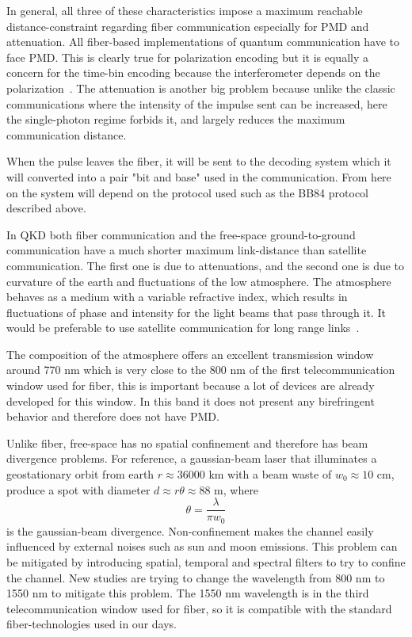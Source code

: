 In general, all three of these characteristics impose a maximum reachable distance-constraint regarding fiber communication especially for PMD and attenuation. All fiber-based implementations of quantum communication have to face PMD. This is clearly true for polarization encoding but it is equally a concern for the time-bin encoding because the interferometer depends on the polarization~\cite{a25}. The attenuation is another big problem because unlike the classic communications where the intensity of the impulse sent can be increased, here the single-photon regime forbids it, and largely reduces the maximum communication distance.

When the pulse leaves the fiber, it will be sent to the decoding system which it will converted into a pair "bit and base" used in the communication. From here on the system will depend on the protocol used such as the BB84 protocol described above.


In QKD both fiber communication and the free-space ground-to-ground communication have a much shorter maximum link-distance than satellite communication. The first one is due to attenuations, and the second one is due to curvature of the earth and fluctuations of the low atmosphere. The atmosphere behaves as a medium with a variable refractive index, which results in fluctuations of phase and intensity for the light beams that pass through it. It would be preferable to use satellite communication for long range links~\cite{a14}.

The composition of the atmosphere offers an excellent transmission window around 770 nm which is very close to the 800 nm of the first telecommunication window used for fiber, this is important because a lot of devices are already developed for this window. In this band it does not present any birefringent behavior and therefore does not have PMD.

Unlike fiber, free-space has no spatial confinement and therefore has beam divergence problems. For reference, a gaussian-beam laser that illuminates a geostationary orbit from earth $r \approx 36000$ km with a beam waste of $w_0 \approx 10$ cm, produce a spot with diameter $d \approx r \theta \approx 88$ m, where
\begin{equation}
  \theta = \frac{\lambda}{\pi w_0}
\end{equation}
is the gaussian-beam divergence. Non-confinement makes the channel easily influenced by external noises such as sun and moon emissions. This problem can be mitigated by introducing spatial, temporal and spectral filters to try to confine the channel. New studies are trying to change the wavelength from 800 nm to 1550 nm to mitigate this problem. The 1550 nm wavelength is in the third telecommunication window used for fiber, so it is compatible with the standard fiber-technologies used in our days.

